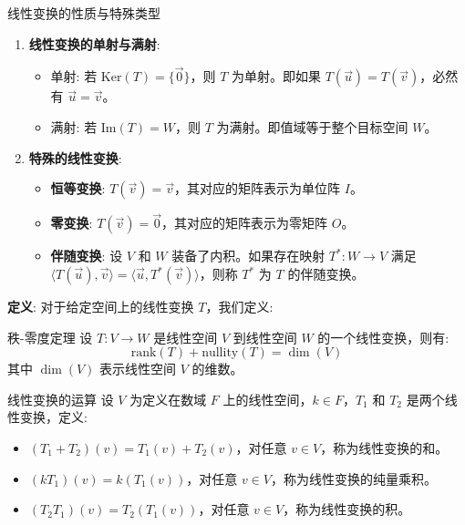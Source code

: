 \documentclass[a4paper,12pt]{ctexart}
\begin{document}
\begin{mydef}{线性变换的性质与特殊类型}{}
\begin{enumerate}
    \item \textbf{线性变换的单射与满射}: 
    \begin{itemize}
        \item 单射: 若 $\text{Ker}(T) = \{\vec{0}\}$，则 $T$ 为单射。即如果 $T(\vec{u}) = T(\vec{v})$，必然有 $\vec{u} = \vec{v}$。
        \item 满射: 若 $\text{Im}(T) = W$，则 $T$ 为满射。即值域等于整个目标空间 $W$。
    \end{itemize}
    
    \item \textbf{特殊的线性变换}:
    \begin{itemize}
        \item \textbf{恒等变换}: $T(\vec{v}) = \vec{v}$，其对应的矩阵表示为单位阵 $I$。
        \item \textbf{零变换}: $T(\vec{v}) = \vec{0}$，其对应的矩阵表示为零矩阵 $O$。
        \item \textbf{伴随变换}: 设 $V$ 和 $W$ 装备了内积。如果存在映射 $T^*: W \to V$ 满足 $\langle T(\vec{u}), \vec{v} \rangle = \langle \vec{u}, T^*(\vec{v}) \rangle$，则称 $T^*$ 为 $T$ 的伴随变换。
    \end{itemize}
\end{enumerate}
\end{mydef}

\textbf{定义}: 对于给定空间上的线性变换 $T$，我们定义:

\begin{mythm}{秩-零度定理}{}
    设 $T: V \to W$ 是线性空间 $V$ 到线性空间 $W$ 的一个线性变换，则有:
    \[
    \text{rank}(T) + \text{nullity}(T) = \dim(V)
    \]
    其中 $\dim(V)$ 表示线性空间 $V$ 的维数。
\end{mythm}

\begin{mydef}{线性变换的运算}{}
设 $V$ 为定义在数域 $F$ 上的线性空间，$k \in F$，$T_1$ 和 $T_2$ 是两个线性变换，定义:
\begin{itemize}
    \item $(T_1 + T_2)(v) = T_1(v) + T_2(v)$，对任意 $v \in V$，称为线性变换的和。
    \item $(kT_1)(v) = k(T_1(v))$，对任意 $v \in V$，称为线性变换的纯量乘积。
    \item $(T_2 T_1)(v) = T_2(T_1(v))$，对任意 $v \in V$，称为线性变换的积。
\end{itemize}
\end{mydef}
\end{document}
